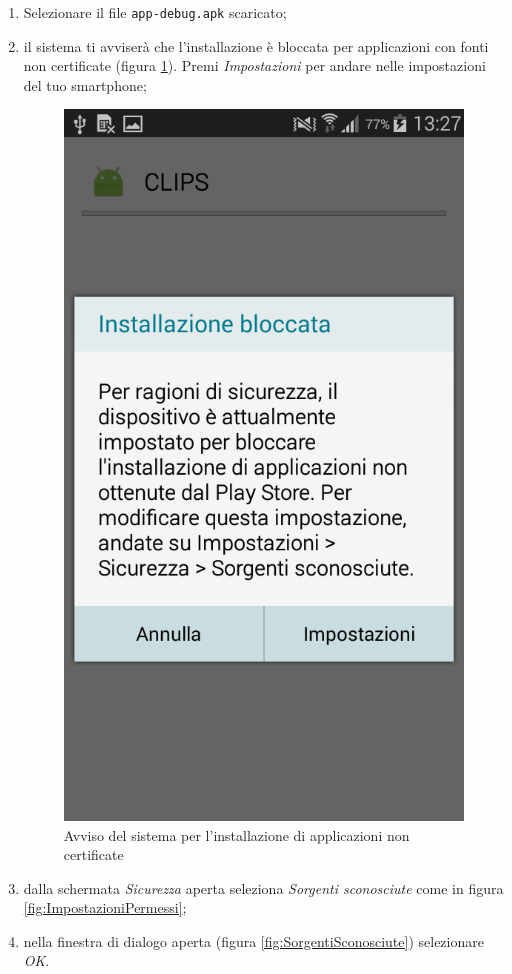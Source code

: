 \documentclass[../ClipsManualeUtente.tex]{subfiles}
\begin{document}
			\begin{enumerate}
				\item Selezionare il file \verb|app-debug.apk| scaricato;
				\item il sistema ti avviserà che l'installazione è bloccata per applicazioni con fonti non certificate (figura \ref{fig:InstallazioneBloccata}). Premi \textit{Impostazioni} per andare nelle impostazioni del tuo smartphone;
				
				\begin{figure}[h]
					\centering
					\includegraphics[scale=0.25]{img/InstallazioneBloccata}
					\caption{Avviso del sistema per l'installazione di applicazioni non certificate}
					\label{fig:InstallazioneBloccata}
				\end{figure}
				
				\item dalla schermata \textit{Sicurezza} aperta seleziona \textit{Sorgenti sconosciute} come in figura \ref{fig:ImpostazioniPermessi};
				\item nella finestra di dialogo aperta (figura \ref{fig:SorgentiSconosciute}) selezionare \textit{OK}.
				\end{enumerate}	
				
\end{document}
